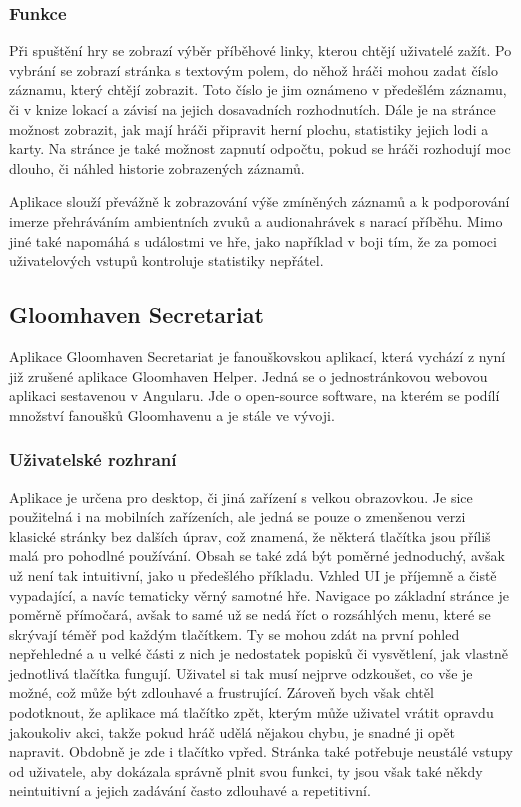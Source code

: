 \subsubsection*{Funkce}
Při spuštění hry se zobrazí výběr příběhové linky, kterou chtějí uživatelé zažít. Po vybrání se zobrazí stránka s textovým polem, do něhož hráči mohou zadat číslo záznamu, který chtějí zobrazit. Toto číslo je jim oznámeno v předešlém záznamu, či v knize lokací a závisí na jejich dosavadních rozhodnutích. Dále je na stránce možnost zobrazit, jak mají hráči připravit herní plochu, statistiky jejich lodi a karty. Na stránce je také možnost zapnutí odpočtu, pokud se hráči rozhodují moc dlouho, či náhled historie zobrazených záznamů.

Aplikace slouží převážně k zobrazování výše zmíněných záznamů a k podporování imerze přehráváním ambientních zvuků a audionahrávek s narací příběhu. Mimo jiné také napomáhá s událostmi ve hře, jako například v boji tím, že za pomoci uživatelových vstupů kontroluje statistiky nepřátel.

\subsection{Gloomhaven Secretariat}
Aplikace Gloomhaven Secretariat je fanouškovskou aplikací, která vychází z nyní již zrušené aplikace Gloomhaven Helper. Jedná se o jednostránkovou webovou aplikaci sestavenou v Angularu. Jde o open-source software, na kterém se podílí množství fanoušků Gloomhavenu a je stále ve vývoji.\cite{gloomhaven_secretariat_github}

\subsubsection*{Uživatelské rozhraní}
Aplikace je určena pro desktop, či jiná zařízení s velkou obrazovkou. Je sice použitelná i na mobilních zařízeních, ale jedná se pouze o zmenšenou verzi klasické stránky bez dalších úprav, což znamená, že některá tlačítka jsou příliš malá pro pohodlné používání. Obsah se také zdá být poměrné jednoduchý, avšak už není tak intuitivní, jako u předešlého příkladu. Vzhled UI je příjemně a čistě vypadající, a navíc tematicky věrný samotné hře. Navigace po základní stránce je poměrně přímočará, avšak to samé už se nedá říct o rozsáhlých menu, které se skrývají téměř pod každým tlačítkem. Ty se mohou zdát na první pohled nepřehledné a u velké části z nich je nedostatek popisků či vysvětlení, jak vlastně jednotlivá tlačítka fungují. Uživatel si tak musí nejprve odzkoušet, co vše je možné, což může být zdlouhavé a frustrující. Zároveň bych však chtěl podotknout, že aplikace má tlačítko zpět, kterým může uživatel vrátit opravdu jakoukoliv akci, takže pokud hráč udělá nějakou chybu, je snadné ji opět napravit. Obdobně je zde i tlačítko vpřed. Stránka také potřebuje neustálé vstupy od uživatele, aby dokázala správně plnit svou funkci, ty jsou však také někdy neintuitivní a jejich zadávání často zdlouhavé a repetitivní.

